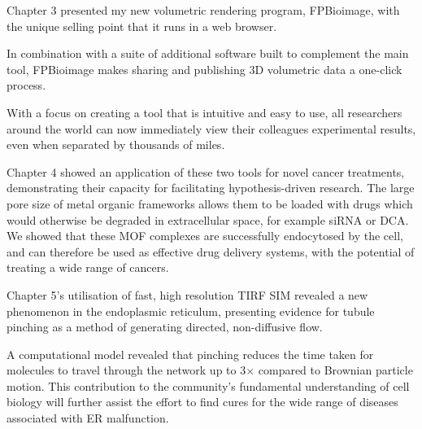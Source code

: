 Chapter 3 presented my new volumetric rendering program, FPBioimage, with the unique selling point that it runs in a web browser.



In combination with a suite of additional software built to complement the main tool, FPBioimage makes sharing and publishing 3D volumetric data a one-click process.  

With a focus on creating a tool that is intuitive and easy to use, all researchers around the world can now immediately view their colleagues experimental results, even when separated by thousands of miles. 




Chapter 4 showed an application of these two tools for novel cancer treatments, demonstrating their capacity for facilitating hypothesis-driven research. 
The large pore size of metal organic frameworks allows them to be loaded with drugs which would otherwise be degraded in extracellular space, for example siRNA or DCA. 
We showed that these MOF complexes are successfully endocytosed by the cell, and can therefore be used as effective drug delivery systems, with the potential of treating a wide range of cancers. 




Chapter 5's utilisation of fast, high resolution TIRF SIM revealed a new phenomenon in the endoplasmic reticulum, presenting evidence for tubule pinching as a method of generating directed, non-diffusive flow. 


A computational model revealed that pinching reduces the time taken for molecules to travel through the network up to 3$\times$ compared to Brownian particle motion. 
This contribution to the community's fundamental understanding of cell biology will further assist the effort to find cures for the wide range of diseases associated with ER malfunction.

